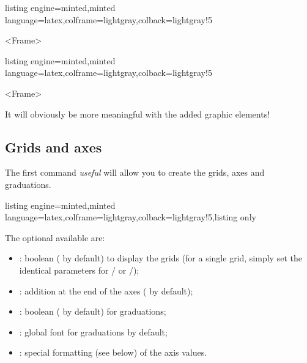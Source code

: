 \documentclass[11pt,a4paper]{ltxdoc}
\begin{document}
\begin{tcblisting}{listing engine=minted,minted language=latex,colframe=lightgray,colback=lightgray!5}
\begin{GraphTikz}
	[x=0.075cm,y=0.03cm,Xmin=0,Xmax=160,Xgrid=20,Xgrids=10,
	Origy=250,Ymin=250,Ymax=400,Ygrid=25,Ygrids=5]
	<Frame>
\end{GraphTikz}
\end{tcblisting}

\begin{tcblisting}{listing engine=minted,minted language=latex,colframe=lightgray,colback=lightgray!5}
\begin{GraphTikz}%
	[x=0.9cm,y=0.425cm,Xmin=4,Xmax=20,Origx=4,
	Ymin=40,Ymax=56,Ygrid=2,Ygrids=1,Origy=40]
	<Frame>
\end{GraphTikz}
\end{tcblisting}

It will obviously be more meaningful with the added graphic elements!

\pagebreak

\subsection{Grids and axes}\label{creaaxesgr}

The first command \textit{useful} will allow you to create the grids, axes and graduations.

\begin{tcblisting}{listing engine=minted,minted language=latex,colframe=lightgray,colback=lightgray!5,listing only}
\end{tcblisting}

The optional \MontreCode{[keys]} available are:

\smallskip

\begin{itemize}
	\item {}: boolean ( by default) to display the grids (for a single grid, simply set the identical parameters for / or /);
	\item {}: addition at the end of the axes ( by default);
	\item {}: boolean ( by default) for graduations;
	\item {}: global font for graduations { by default};
	\item {}: special formatting (see below) of the axis values.
\end{itemize}
\end{document}
